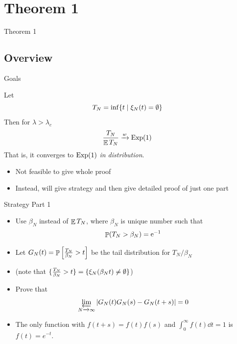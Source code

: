 \documentclass{beamer}
\begin{document}
\section{Theorem 1}

\begin{frame}{Theorem 1}
  \tableofcontents[currentsection]
\end{frame}

\subsection{Overview}

\begin{frame}{Goals}
  \begin{theorem}
    Let \[ T_{N} = \inf\set{t \st \xi_{N}(t) = \emptyset} \]
    Then for $\lambda > \lambda_{c}$
    \[ \frac{T_{N}}{\E T_{N}} \to[w] \expDist(1) \]
    That is, it converges to $\expDist(1)$ \emph{in distribution}.
  \end{theorem}
  \pause
  \begin{itemize}
    \item Not feasible to give whole proof
          \pause
    \item Instead, will give strategy and then give detailed proof of just one part
  \end{itemize}
\end{frame}

\begin{frame}{Strategy Part 1}
  \begin{itemize}
    \item Use $\beta_{N}$ instead of $\E T_{N}$, where $\beta_{N}$ is unique number such that
    \[ \Prob(T_{N} > \beta_{N}) = \e^{-1} \]
          \pause
    \item Let $G_{N}(t) = \Prob\left[ \frac{T_{N}}{\beta_{N}} > t\right]$ be the tail distribution for $T_{N} / \beta_{N}$
          \pause
    \item(note that $\set{ \frac{T_N}{\beta_N} > t} = \set{\xi_{N}(\beta_{N}t) \neq \emptyset}$)
          \pause
    \item Prove that
          \[ \limas_{N \to \infty} \abs{G_{N}(t)G_{N}(s) - G_{N}(t+s)} = 0 \]
    \item The only function with $f(t+s) = f(t)f(s)$ and $\int_{0}^{\infty} f(t) \dd{t} = 1$ is $f(t) = e^{-t}$.
  \end{itemize}
\end{frame}
\end{document}
